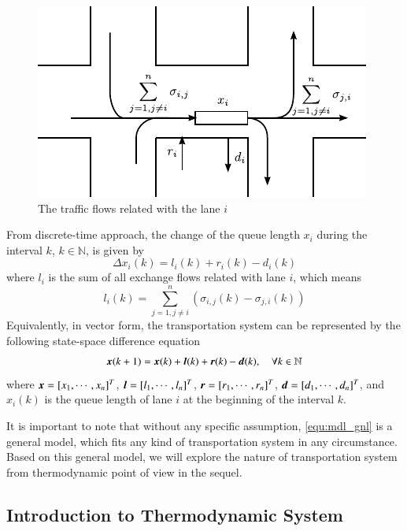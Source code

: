 \documentclass[preprint,authoryear,12pt]{elsarticle}
\renewcommand{\vec}[1]{\mbox{\boldmath$#1$}}
\begin{document}
\begin{figure}[ht]
  \centering
  \includegraphics{pics/flows}
  \caption{The traffic flows related with the lane $i$}
  \label{fig:flows}
\end{figure}

From discrete-time approach, the change of the queue length $x_i$
during the interval $k$, $k\in\mathbb{N}$, is given by
\begin{equation}\label{equ:mdl_gnl_lane}
\Delta x_i(k) = l_i(k)+r_i(k)-d_i(k)
\end{equation}
where $l_i$ is the sum of all exchange flows related with lane $i$,
which means
\begin{equation}\label{equ:exchange_vehicle}
 l_i(k)=\sum_{j=1,j\neq i}^{n}(\sigma_{i,j}(k)-\sigma_{j,i}(k))
\end{equation}
Equivalently, in vector form, the transportation system can be
represented by the following state-space difference equation
\begin{equation}\label{equ:mdl_gnl}
\vec{x}(k+1)=\vec{x}(k)+\vec{l}(k)+\vec{r}(k)-\vec{d}(k),\quad \forall k\in\mathbb{N}
\end{equation}
where $\vec{x}=[x_1,\cdots,x_n]^T$, $\vec{l}=[l_1,\cdots,l_n]^T$,
$\vec{r}=[r_1,\cdots,r_n]^T$, $\vec{d}=[d_1,\cdots,d_n]^T$, and
$x_i(k)$ is the queue length of lane $i$ at the beginning of the
interval $k$.

It is important to note that without any specific assumption,
\eqref{equ:mdl_gnl} is a general model, which fits any kind of
transportation system in any circumstance. Based on this general
model, we will explore the nature of transportation system from
thermodynamic point of view in the sequel.

\subsection{Introduction to Thermodynamic System}
\end{document}
